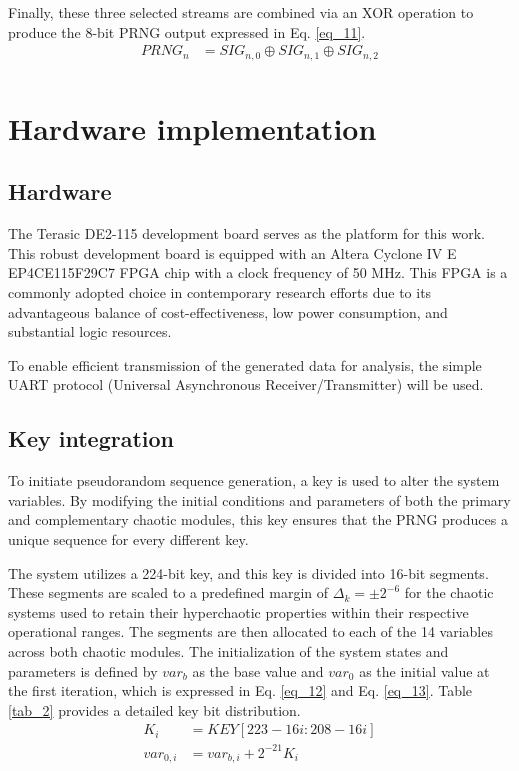 \documentclass[preprint, 12pt, sort&compress]{elsarticle}
\begin{document}
Finally, these three selected streams are combined via an XOR operation to produce the 8-bit PRNG output expressed in Eq. \ref{eq_11}.
\begin{equation}
\begin{aligned}
    PRNG_n &= SIG_{n,0} \oplus SIG_{n,1} \oplus SIG_{n,2} \\
\end{aligned}
\label{eq_11}
\end{equation}

\section{Hardware implementation}\label{sec_4}
\subsection{Hardware}
The Terasic DE2-115 development board serves as the platform for this work. This robust development board is equipped with an Altera Cyclone IV E EP4CE115F29C7 FPGA chip with a {\color{red} clock frequency of 50 MHz}. This FPGA is a commonly adopted choice in contemporary research efforts  \cite{meranza-castillon_pseudorandom_2019} due to its advantageous balance of cost-effectiveness, low power consumption, and substantial logic resources.

To enable efficient transmission of the generated data for analysis, the simple UART protocol (Universal Asynchronous Receiver/Transmitter) will be used.

\subsection{Key integration}
To initiate pseudorandom sequence generation, a key is used to alter the system variables. By modifying the initial conditions and parameters of both the primary and complementary chaotic modules, this key ensures that the PRNG produces a unique sequence for every different key.

The system utilizes a 224-bit key, and this key is divided into 16-bit segments. These segments are scaled to a predefined margin of $\Delta_k=\pm2^{-6}$ for the chaotic systems used to retain their hyperchaotic properties within their respective operational ranges. The segments are then allocated to each of the 14 variables across both chaotic modules. The initialization of the system states and parameters is defined by $var_b$ as the base value and $var_0$ as the initial value at the first iteration, which is expressed in Eq. \ref{eq_12} and Eq. \ref{eq_13}. Table \ref{tab_2} provides a detailed key bit distribution.
\begin{align}
\label{eq_12}
K_i &= KEY\left[223-16i:208-16i\right] \\
\label{eq_13}
var_{0,i} &= var_{b,i}+2^{-21}K_i
\end{align}
\end{document}
